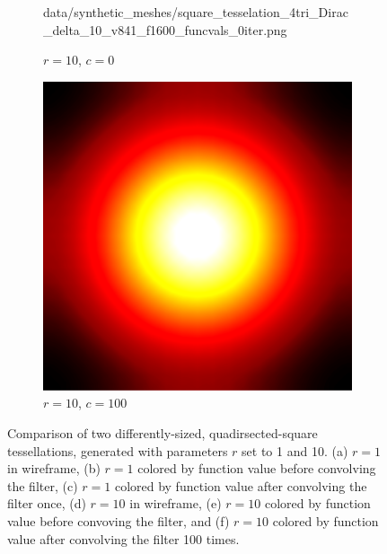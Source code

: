 \begin{figure}[ht]
\begin{subfigure}[b]{0.32\linewidth}
		{data/synthetic_meshes/square_tesselation_4tri_Dirac_delta_10_v841_f1600_funcvals_0iter.png}
		\caption{$r=10$, $c=0$}\label{fig:sq2.e}
	\end{subfigure}
	\begin{subfigure}[b]{0.32\linewidth}
		\includegraphics[width=\linewidth]
		{data/synthetic_meshes/square_tesselation_4tri_Dirac_delta_10_v841_f1600_funcvals_100iter.png}
		\caption{$r=10$, $c=100$}\label{fig:sq2.f}
	\end{subfigure}
	\caption[Six Views Comparing Quadirsected-Square Tessellations]{Comparison of two differently-sized, quadirsected-square tessellations, generated with parameters $r$ set to 1 and 10. (a) $r=1$ in wireframe, (b) $r=1$ colored by function value before convolving the filter, (c) $r=1$ colored by function value after convolving the filter once, (d) $r=10$ in wireframe, (e) $r=10$ colored by function value before convoving the filter, and (f) $r=10$ colored by function value after convolving the filter 100 times.}
	\label{fig:sq4}
\end{figure}
